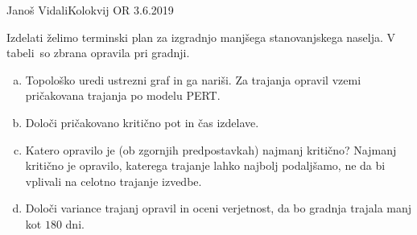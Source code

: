 \begin{naloga}{Janoš Vidali}{Kolokvij OR 3.6.2019}
\begin{vprasanje}
Izdelati želimo terminski plan za izgradnjo manjšega stanovanjskega naselja.
V tabeli~\tab so zbrana opravila pri gradnji.

\begin{enumerate}[(a)]
\item Topološko uredi ustrezni graf in ga nariši.
Za trajanja opravil vzemi pričakovana trajanja po modelu PERT.

\item Določi pričakovano kritično pot in čas izdelave.

\item Katero opravilo je (ob zgornjih predpostavkah) najmanj kritično?
Najmanj kritično je opravilo, katerega trajanje lahko najbolj podaljšamo,
ne da bi vplivali na celotno trajanje izvedbe.

\item Določi variance trajanj opravil in oceni ve\-rjet\-nost,
da bo grad\-nja trajala manj kot $180$ dni.
\end{enumerate}
%
\begin{tabela}
\end{tabela}
\end{vprasanje}

\begin{odgovor}
\end{odgovor}
\end{naloga}

